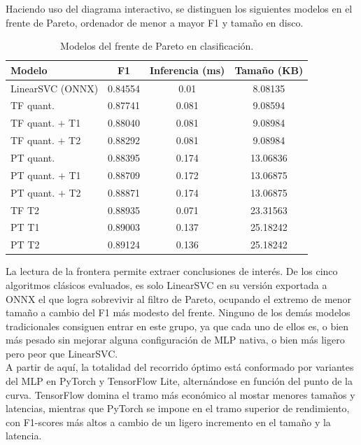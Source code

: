 \documentclass[a4paper,12pt,twoside,final]{book}
\begin{document}
Haciendo uso del diagrama interactivo, se distinguen los siguientes modelos en el frente de Pareto, ordenador de menor a
mayor F1 y tamaño en disco.
\begin{table}[htbp]
  \centering
  \begin{tabularx}{\textwidth}{Xccc}
    \hline
    \textbf{Modelo} & \textbf{F1} & \textbf{Inferencia (ms)} & \textbf{Tamaño (KB)} \\
    \hline
    LinearSVC (ONNX) & 0.84554 & 0.01  & 8.08135  \\
    TF quant.               & 0.87741 & 0.081 & 9.08594  \\
    TF quant. $+$ T1        & 0.88040 & 0.081 & 9.08984  \\
    TF quant. $+$ T2        & 0.88292 & 0.081 & 9.08984  \\
    PT quant.               & 0.88395 & 0.174 & 13.06836 \\
    PT quant. $+$ T1        & 0.88709 & 0.172 & 13.06875 \\
    PT quant. $+$ T2        & 0.88871 & 0.174 & 13.06875 \\
    TF T2                   & 0.88935 & 0.071 & 23.31563 \\
    PT T1                   & 0.89003 & 0.137 & 25.18242 \\
    PT T2                   & 0.89124 & 0.136 & 25.18242 \\
    \hline
  \end{tabularx}
  \caption{Modelos del frente de Pareto en clasificación.}
  \label{tab:pareto_global_clas}
\end{table}

La lectura de la frontera permite extraer conclusiones de interés. De los cinco algoritmos clásicos evaluados, es solo
LinearSVC en su versión exportada a ONNX el que logra sobrevivir al filtro de Pareto, ocupando el extremo de menor
tamaño a cambio del F1 más modesto del frente. Ninguno de los demás modelos tradicionales consiguen entrar en este grupo,
ya que cada uno de ellos es, o bien más pesado sin mejorar alguna configuración de MLP nativa, o bien más ligero pero
peor que LinearSVC.\\

A partir de aquí, la totalidad del recorrido óptimo está conformado por variantes del MLP en PyTorch y TensorFlow Lite,
alternándose en función del punto de la curva. TensorFlow domina el tramo más económico al mostar menores tamaños y
latencias, mientras que PyTorch se impone en el tramo superior de rendimiento, con F1-scores más altos a cambio de un
ligero incremento en el tamaño y la latencia.\\
\end{document}

